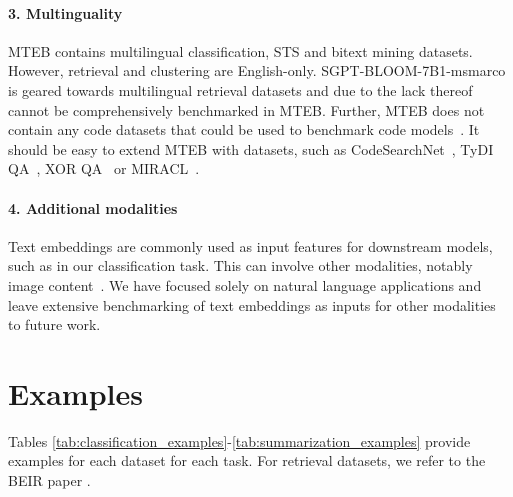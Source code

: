 \documentclass[11pt]{article}
\begin{document}
\paragraph{3. Multinguality} MTEB contains multilingual classification, STS and bitext mining datasets. However, retrieval and clustering are English-only. SGPT-BLOOM-7B1-msmarco is geared towards multilingual retrieval datasets and due to the lack thereof cannot be comprehensively benchmarked in MTEB. Further, MTEB does not contain any code datasets that could be used to benchmark code models~\cite{neelakantan2022text,allal2023santacoder}. It should be easy to extend MTEB with datasets, such as CodeSearchNet~\cite{husain2019codesearchnet}, TyDI QA~\cite{clark2020tydi}, XOR QA~\cite{asai2020xor} or MIRACL~\cite{zhang2022making}. 

\paragraph{4. Additional modalities} Text embeddings are commonly used as input features for downstream models, such as in our classification task. This can involve other modalities, notably image content~\cite{carvalho2018cross,tan2019lxmert,muennighoff2020vilio,nichol2021glide,saharia2022photorealistic,weinbach2022m}. We have focused solely on natural language applications and leave extensive benchmarking of text embeddings as inputs for other modalities to future work.

\section{Examples}
\label{sec:examples}

Tables \ref{tab:classification_examples}-\ref{tab:summarization_examples} provide examples for each dataset for each task. For retrieval datasets, we refer to the BEIR paper \cite{beir}.
\end{document}

